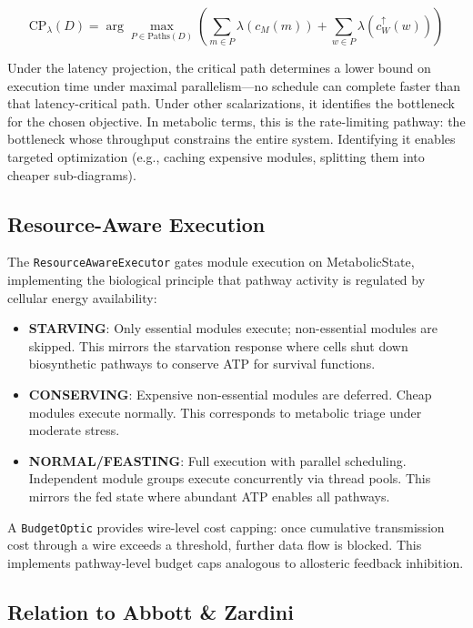 \[
\text{CP}_{\lambda}(D) = \arg\max_{P \in \text{Paths}(D)}
\left(\sum_{m \in P} \lambda(c_M(m)) + \sum_{w \in P} \lambda(c_W^\uparrow(w))\right)
\]

Under the latency projection, the critical path determines a lower bound
on execution time under maximal parallelism---no schedule can complete
faster than that latency-critical path. Under other scalarizations, it
identifies the bottleneck for the chosen objective. In metabolic terms, this is the rate-limiting pathway: the
bottleneck whose throughput constrains the entire system. Identifying
it enables targeted optimization (e.g., caching expensive modules,
splitting them into cheaper sub-diagrams).

\subsection{Resource-Aware Execution}

The \texttt{ResourceAwareExecutor} gates module execution on MetabolicState,
implementing the biological principle that pathway activity is regulated
by cellular energy availability:

\begin{itemize}[leftmargin=*]
\item \textbf{STARVING}: Only essential modules execute; non-essential
modules are skipped. This mirrors the starvation response where cells
shut down biosynthetic pathways to conserve ATP for survival functions.

\item \textbf{CONSERVING}: Expensive non-essential modules are deferred.
Cheap modules execute normally. This corresponds to metabolic triage
under moderate stress.

\item \textbf{NORMAL/FEASTING}: Full execution with parallel scheduling.
Independent module groups execute concurrently via thread pools. This
mirrors the fed state where abundant ATP enables all pathways.
\end{itemize}

\noindent A \texttt{BudgetOptic} provides wire-level cost capping:
once cumulative transmission cost through a wire exceeds a threshold,
further data flow is blocked. This implements pathway-level budget
caps analogous to allosteric feedback inhibition.

\subsection{Relation to Abbott \& Zardini}

